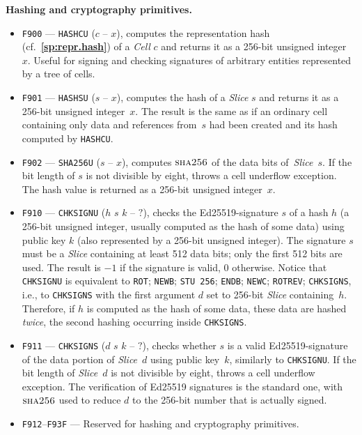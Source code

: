 \documentclass[12pt,oneside]{article}
\def\makepoint#1{\medbreak\noindent{\bf #1.\ }}
\def\nxsubpoint{\refstepcounter{subsubsection}%
  \smallbreak\makepoint{\thesubsubsection}}
\def\refpoint#1{{\rm\textbf{\ref{#1}}}}
\let\ptref=\refpoint
\def\emb#1{\textbf{#1.}}
\def\opsc#1{\operatorname{\textsc{#1}}}
\def\Sha{\opsc{sha256}}
\begin{document}
\nxsubpoint\emb{Hashing and cryptography primitives}
\begin{itemize}
\item {\tt F900} --- {\tt HASHCU} ($c$ -- $x$), computes the representation hash (cf.~\ptref{sp:repr.hash}) of a {\em Cell\/} $c$ and returns it as a 256-bit unsigned integer~$x$. Useful for signing and checking signatures of arbitrary entities represented by a tree of cells.
\item {\tt F901} --- {\tt HASHSU} ($s$ -- $x$), computes the hash of a {\em Slice\/} $s$ and returns it as a 256-bit unsigned integer~$x$. The result is the same as if an ordinary cell containing only data and references from~$s$ had been created and its hash computed by {\tt HASHCU}.
\item {\tt F902} --- {\tt SHA256U} ($s$ -- $x$), computes $\Sha$ of the data bits of~{\em Slice\/}~$s$. If the bit length of $s$ is not divisible by eight, throws a cell underflow exception. The hash value is returned as a 256-bit unsigned integer~$x$.
\item {\tt F910} --- {\tt CHKSIGNU} ($h$ $s$ $k$ -- $?$), checks the Ed25519-signature $s$ of a hash $h$ (a 256-bit unsigned integer, usually computed as the hash of some data) using public key $k$ (also represented by a 256-bit unsigned integer). The signature $s$ must be a {\em Slice\/} containing at least 512 data bits; only the first 512 bits are used. The result is $-1$ if the signature is valid, $0$ otherwise. Notice that {\tt CHKSIGNU} is equivalent to {\tt ROT}; {\tt NEWB}; {\tt STU 256}; {\tt ENDB}; {\tt NEWC}; {\tt ROTREV}; {\tt CHKSIGNS}, i.e., to {\tt CHKSIGNS} with the first argument $d$ set to 256-bit {\em Slice} containing~$h$. Therefore, if $h$ is computed as the hash of some data, these data are hashed {\em twice}, the second hashing occurring inside {\tt CHKSIGNS}.
\item {\tt F911} --- {\tt CHKSIGNS} ($d$ $s$ $k$ -- $?$), checks whether $s$ is a valid Ed25519-signature of the data portion of {\em Slice\/}~$d$ using public key~$k$, similarly to {\tt CHKSIGNU}. If the bit length of {\em Slice\/}~$d$ is not divisible by eight, throws a cell underflow exception. The verification of Ed25519 signatures is the standard one, with $\Sha$ used to reduce $d$ to the 256-bit number that is actually signed.
\item {\tt F912}--{\tt F93F} --- Reserved for hashing and cryptography primitives.
\end{itemize}
\end{document}
